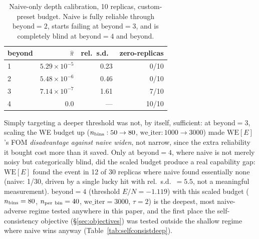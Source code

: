 \documentclass[a4paper,fleqn]{cas-sc}
\begin{document}
\begin{table}[h]
	\centering\small
	\caption{Naive-only depth calibration, 10 replicas, custom-preset budget. Naive is
		fully reliable through $\mathrm{beyond}=2$, starts failing at $\mathrm{beyond}=3$,
		and is completely blind at $\mathrm{beyond}=4$ and beyond.}
	\label{tab:deeprare}
	\begin{tabular}{lrrr}
		\toprule
		beyond & $\hat\pi$ & rel.\ s.d.\ & zero-replicas \\
		\midrule
		1 & $5.29\times10^{-5}$ & 0.23 & 0/10 \\
		2 & $5.48\times10^{-6}$ & 0.46 & 0/10 \\
		3 & $7.14\times10^{-7}$ & 1.61 & 7/10 \\
		4 & $0.0$ & --- & 10/10 \\
		\bottomrule
	\end{tabular}
\end{table}

Simply targeting a deeper threshold was not, by itself, sufficient: at $\mathrm{beyond}=3$,
scaling the WE budget up ($n_{\rm bins}:50\to80$, $\mathrm{we\_iter}:1000\to3000$) made
$\mathrm{WE}[E]$'s FOM \emph{disadvantage against naive widen}, not narrow, since the
extra reliability it bought cost more than it saved. Only at $\mathrm{beyond}=4$, where
naive is not merely noisy but categorically blind, did the scaled budget produce a real
capability gap: $\mathrm{WE}[E]$ found the event in 12 of 30 replicas where naive found
essentially none (naive: 1/30, driven by a single lucky hit with rel.\ s.d.\ $=5.5$, not
a meaningful measurement). $\mathrm{beyond}=4$ (threshold $E/N=-1.119$) with this scaled
budget ($n_{\rm bins}=80$, $n_{\rm per\ bin}=40$, $\mathrm{we\_iter}=3000$, $\tau=2$) is
the deepest, most naive-adverse regime tested anywhere in this paper, and the first
place the self-consistency objective (\S\ref{sec:objectives}) was tested outside the
shallow regime where naive wins anyway (Table~\ref{tab:selfconsistdeep}).
\end{document}
